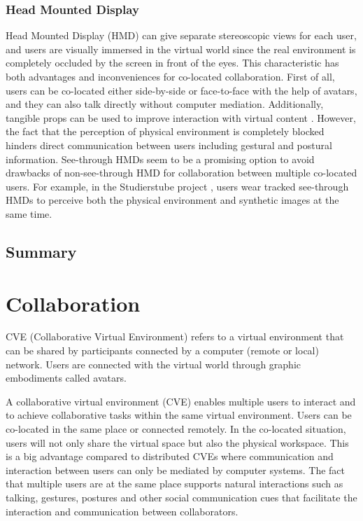 \subsubsection{Head Mounted Display}
Head Mounted Display (HMD) can give separate stereoscopic views for each user, and users are visually immersed in the virtual world since the real environment is completely occluded by the screen in front of the eyes. This characteristic has both advantages and inconveniences for co-located collaboration. First of all, users can be co-located either side-by-side or face-to-face with the help of avatars, and they can also talk directly without computer mediation. Additionally, tangible props can be used to improve interaction with virtual content \citep{Salzmann2008TUS}. However, the fact that the perception of physical environment is completely blocked hinders direct communication between users including gestural and postural information. See-through HMDs seem to be a promising option to avoid drawbacks of non-see-through HMD for collaboration between multiple co-located users. For example, in the Studierstube project \citep{Schmalstieg2002Stube}, users wear tracked see-through HMDs to perceive both the physical environment and synthetic images at the same time.

\subsection{Summary}

\section{Collaboration}
CVE (Collaborative Virtual Environment) refers to a virtual environment that can be shared by participants connected by a computer (remote or local) network. Users are connected with the virtual world through graphic embodiments called avatars.

A collaborative virtual environment (CVE) \citep{Benford2001CVE} enables multiple users to interact \citep{Schroeder2006Usability} and to achieve collaborative tasks \citep{Dodds2009Using} within the same virtual environment. Users can be co-located in the same place or connected remotely. In the co-located situation, users will not only share the virtual space but also the physical workspace. This is a big advantage compared to distributed CVEs where communication and interaction between users can only be mediated by computer systems. The fact that multiple users are at the same place supports natural interactions such as talking, gestures, postures and other social communication cues that facilitate the interaction and communication between collaborators.

